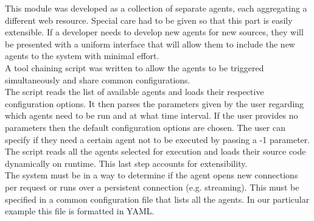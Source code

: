 \documentclass[12pt]{article}
\newcounter{subsubsubsection}[subsubsection]
\begin{document}

This module was developed as a collection of separate agents, each aggregating a different web resource. Special care had to be given so that this part is easily extensible. If a developer needs to develop new agents for new sources, they will be presented with a uniform interface that will allow them to include the new agents to the system with minimal effort. 
\hfill \break \\
A tool chaining script was written to allow the agents to be triggered simultaneously and share common configurations. 
\hfill \break \\
The script reads the list of available agents and loads their respective configuration options. It then parses the parameters given by the user regarding which agents need to be run and at what time interval. If the user provides no parameters then the default configuration options are chosen. The user can specify if they need a certain agent not to be executed by passing a -1 parameter. The script reads all the agents selected for execution and loads their source code dynamically on runtime. This last step accounts for extensibility. 
\hfill \break \\
The system must be in a way to determine if the agent opens new connections per request or runs over a persistent connection (e.g. streaming). This must be specified in a common configuration file that lists all the agents. In our particular example this file is formatted in YAML. 
\end{document}
